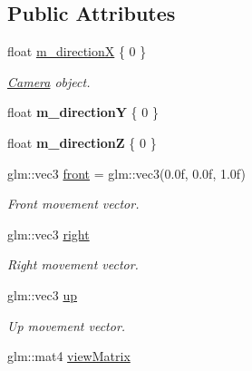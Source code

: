 \subsection*{Public Attributes}
\begin{DoxyCompactItemize}
\item 
float \hyperlink{class_camera_component_a7a95ace18cee6a6b88ac5873233e2cc3}{m\+\_\+direction\+X} \{ 0 \}
\begin{DoxyCompactList}\small\item\em \hyperlink{class_camera}{Camera} object. \end{DoxyCompactList}\item 
\hypertarget{class_camera_component_a89b5e6d77f8def9bdcdda71be27cd83f}{float {\bfseries m\+\_\+direction\+Y} \{ 0 \}}\label{class_camera_component_a89b5e6d77f8def9bdcdda71be27cd83f}

\item 
\hypertarget{class_camera_component_abfe4cac0ee5fc5768bdedada791b925e}{float {\bfseries m\+\_\+direction\+Z} \{ 0 \}}\label{class_camera_component_abfe4cac0ee5fc5768bdedada791b925e}

\item 
\hypertarget{class_camera_component_a3cc09f3e499de24e429ad2ad30b6ff43}{glm\+::vec3 \hyperlink{class_camera_component_a3cc09f3e499de24e429ad2ad30b6ff43}{front} = glm\+::vec3(0.\+0f, 0.\+0f, 1.\+0f)}\label{class_camera_component_a3cc09f3e499de24e429ad2ad30b6ff43}

\begin{DoxyCompactList}\small\item\em Front movement vector. \end{DoxyCompactList}\item 
\hypertarget{class_camera_component_a62040ca115beaa48627fe56d330647c0}{glm\+::vec3 \hyperlink{class_camera_component_a62040ca115beaa48627fe56d330647c0}{right}}\label{class_camera_component_a62040ca115beaa48627fe56d330647c0}

\begin{DoxyCompactList}\small\item\em Right movement vector. \end{DoxyCompactList}\item 
\hypertarget{class_camera_component_a639f14e0057198d84ed8de71c3df3303}{glm\+::vec3 \hyperlink{class_camera_component_a639f14e0057198d84ed8de71c3df3303}{up}}\label{class_camera_component_a639f14e0057198d84ed8de71c3df3303}

\begin{DoxyCompactList}\small\item\em Up movement vector. \end{DoxyCompactList}\item 
\hypertarget{class_camera_component_aa9ba12dfc1a9b7b06bf79fdb0a91a3e2}{glm\+::mat4 \hyperlink{class_camera_component_aa9ba12dfc1a9b7b06bf79fdb0a91a3e2}{view\+Matrix}}\label{class_camera_component_aa9ba12dfc1a9b7b06bf79fdb0a91a3e2}


\end{DoxyCompactItemize}
